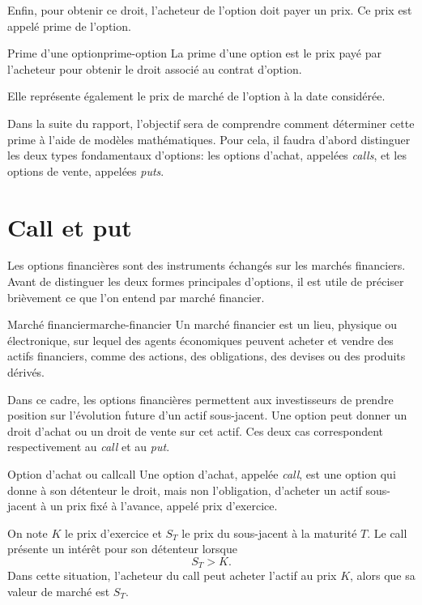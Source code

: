 \documentclass[11pt]{report}
\begin{document}
Enfin, pour obtenir ce droit, l'acheteur de l'option doit payer un prix. Ce prix est appelé prime de l'option.

\begin{definition}{Prime d'une option}{prime-option}
La prime d'une option est le prix payé par l'acheteur pour obtenir le droit associé au contrat d'option.

Elle représente également le prix de marché de l'option à la date considérée.
\end{definition}

Dans la suite du rapport, l'objectif sera de comprendre comment déterminer cette prime à l'aide de modèles mathématiques. Pour cela, il faudra d'abord distinguer les deux types fondamentaux d'options: les options d'achat, appelées \textit{calls}, et les options de vente, appelées \textit{puts}.


\section{Call et put}

Les options financières sont des instruments échangés sur les marchés financiers. Avant de distinguer les deux formes principales d'options, il est utile de préciser brièvement ce que l'on entend par marché financier.

\begin{definition}{Marché financier}{marche-financier}
Un marché financier est un lieu, physique ou électronique, sur lequel des agents économiques peuvent acheter et vendre des actifs financiers, comme des actions, des obligations, des devises ou des produits dérivés.
\end{definition}

Dans ce cadre, les options financières permettent aux investisseurs de prendre position sur l'évolution future d'un actif sous-jacent. Une option peut donner un droit d'achat ou un droit de vente sur cet actif. Ces deux cas correspondent respectivement au \textit{call} et au \textit{put}.

\begin{definition}{Option d'achat ou call}{call}
Une option d'achat, appelée \textit{call}, est une option qui donne à son détenteur le droit, mais non l'obligation, d'acheter un actif sous-jacent à un prix fixé à l'avance, appelé prix d'exercice.

On note $K$ le prix d'exercice et $S_T$ le prix du sous-jacent à la maturité $T$. Le call présente un intérêt pour son détenteur lorsque
\[
S_T > K.
\]
Dans cette situation, l'acheteur du call peut acheter l'actif au prix $K$, alors que sa valeur de marché est $S_T$.
\end{definition}
\end{document}

